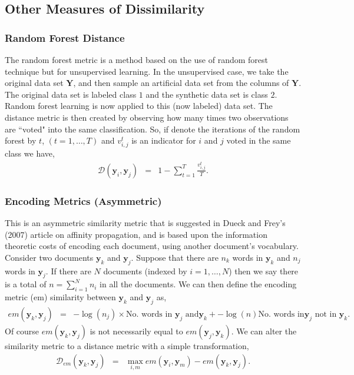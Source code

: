 \documentclass[11pt,letterpaper]{article}
\numberwithin{equation}{section}
\begin{document}
\subsection{Other Measures of Dissimilarity}
\subsubsection{Random Forest Distance}
The random forest metric is a method based on the use of random
forest technique but for unsupervised learning.  In the unsupervised
case, we take the original data set $\boldsymbol{Y}$, and then
sample an artificial data set from the columns of $\boldsymbol{Y}$.
The original data set is labeled class $1$ and the synthetic data
set is class $2$.  Random forest learning is now applied to this
(now labeled) data set.  The distance metric is then created by
observing how many times two observations are ``voted" into the same
classification. So, if denote the iterations of the random forest by
$t$, $(t = 1, \hdots, T)$ and $v_{i,j}^{t}$ is an indicator for $i$
and $j$ voted in the same class we have,
\begin{eqnarray}
\mathcal{D}(\boldsymbol{y}_i, \boldsymbol{y}_j) & = &
 1 - \sum_{t=1}^{T}\frac{v_{i,j}^{t}}{T}. \nonumber
 \end{eqnarray}

\subsubsection{Encoding Metrics (Asymmetric)}
This is an asymmetric similarity metric that is suggested in Dueck
and Frey's (2007) article on affinity propagation, and is based upon
the information theoretic costs of encoding each document, using
another document's vocabulary.  \\
\indent Consider two documents $\boldsymbol{y}_k$ and
$\boldsymbol{y}_j$.  Suppose that there are $n_k$ words in
$\boldsymbol{y}_k$  and $n_j$ words in  $\boldsymbol{y}_j$.  If
there are $N$ documents (indexed by $i = 1, \hdots, N$) then we say
there is a total of $n = \sum_{i=1}^{N} n_i$ in all the documents.
We can then define the encoding metric (em) similarity between
$\boldsymbol{y}_k$ and $\boldsymbol{y}_j$ as,
\begin{eqnarray}
em(\boldsymbol{y}_k, \boldsymbol{y}_j) & = & - \log\left(n_j\right)
 \times \text{No. words in $\boldsymbol{y}_j$ and
$\boldsymbol{y}_k$} + - \log \left( n \right) \text{No. words in
$\boldsymbol{y}_j$ not in $\boldsymbol{y}_k$}. \nonumber
\end{eqnarray}
Of course $em(\boldsymbol{y}_k, \boldsymbol{y}_j)$ is not
necessarily equal to $em(\boldsymbol{y}_j, \boldsymbol{y}_k)$.  We
can alter the similarity metric to a distance metric with a simple
transformation,
\begin{eqnarray}
\mathcal{D}_{em}(\boldsymbol{y}_k, \boldsymbol{y}_j ) & = & \max_{i,
m}em(\boldsymbol{y}_i, \boldsymbol{y}_m)  - em(\boldsymbol{y}_k,
\boldsymbol{y}_j). \nonumber
\end{eqnarray}
\end{document}
